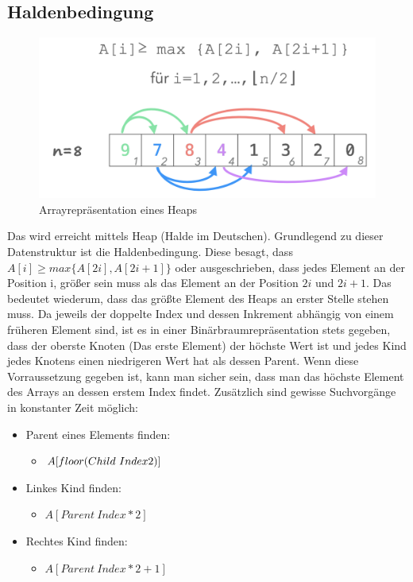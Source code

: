 \documentclass{article}
\begin{document}
	\subsection{Haldenbedingung}
	\begin{figure}[H]
	\centering
	\includegraphics[scale=0.5]{Bilder/heap.png}
	\caption{Arrayrepräsentation eines Heaps}
	\end{figure}
	Das wird erreicht mittels Heap (Halde im Deutschen). Grundlegend zu dieser Datenstruktur ist die Haldenbedingung. Diese besagt, dass $A[i]\geq max \{A[2i], A[2i+1]\}$ oder ausgeschrieben, dass jedes Element an der Position i, größer sein muss als das Element an der Position $2i$ und $2i+1$. Das bedeutet wiederum, dass das größte Element des Heaps an erster Stelle stehen muss. Da jeweils der doppelte Index und dessen Inkrement abhängig von einem früheren Element sind, ist es in einer Binärbraumrepräsentation stets gegeben, dass der oberste Knoten (Das erste Element) der höchste Wert ist und jedes Kind jedes Knotens einen niedrigeren Wert hat als dessen Parent. Wenn diese Vorraussetzung gegeben ist, kann man sicher sein, dass man das höchste Element des Arrays an dessen erstem Index findet. Zusätzlich sind gewisse Suchvorgänge in konstanter Zeit möglich:
	\begin{itemize}
		\item{Parent eines Elements finden:}
		\begin{itemize}
			\item{$A[floor(Child\ Index\/2)]$}
		\end{itemize}
		\item{Linkes Kind finden:}
		\begin{itemize}
			\item{$A[Parent\ Index*2]$}
		\end{itemize}
		\item{Rechtes Kind finden:}
		\begin{itemize}
			\item{$A[Parent\ Index*2+1]$}
		\end{itemize}
	\end{itemize}
\end{document}
